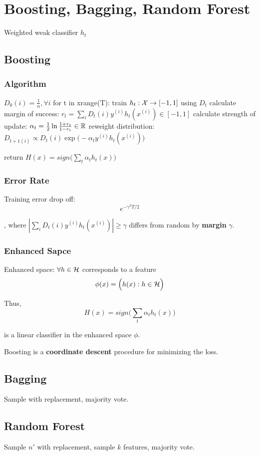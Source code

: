 \documentclass[a4paper]{report}
\begin{document}
\chapter{Boosting, Bagging, Random Forest}
Weighted weak classifier $h_t$

\section{Boosting}
\subsection{Algorithm}
\begin{python}[mathescape]
$D_0(i)=\frac{1}{n}, \forall i$
for t in xrange(T):
  train $h_t: \mathcal{X}\rightarrow [-1, 1]$ using $D_t$
  calculate margin of success: $r_t=\sum_i D_t(i)y^{(i)}h_t(x^{(i)})\in [-1, 1]$
  calculate strength of update: $\alpha_t = \frac{1}{2}\ln {\frac{1+r_t}{1-r_t}}\in \mathbb{R}$
  reweight distribution: $D_{t+1(i)}\propto D_t(i)\exp\big(-\alpha_t y^{(i)}h_t(x^{(i)})\big)$
  
return $H(x)=sign\Big(\sum_t \alpha_t h_t(x)\Big)$
\end{python}

\subsection{Error Rate}
Training error drop off:
$$
e^{-\gamma^2T/2}
$$

, where $|\sum_i D_t(i)y^{(i)}h_t(x^{(i)})|\geq \gamma$ differs from random by \textbf{margin} $\gamma$.

\subsection{Enhanced Sapce}
Enhanced space: $\forall h \in \mathcal{H}$ corresponds to a feature 
$$
\phi(x) = \Big(h(x):h\in \mathcal{H}\Big)
$$

Thus, 
$$
H(x) = sign\Big(\sum_t \alpha_t h_t(x)\Big)
$$

is a linear classifier in the enhanced space $\phi$. 

Boosting is a \textbf{coordinate descent} procedure for minimizing the loss.

\section{Bagging}
Sample with replacement, majority vote.

\section{Random Forest}
Sample $n'$ with replacement, sample $k$ features, majority vote.
\end{document}

